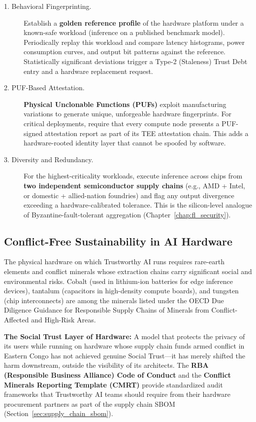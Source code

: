 \begin{description}
  \item[1. Behavioral Fingerprinting.] Establish a \textbf{golden reference profile} of the hardware platform under a known-safe workload (inference on a published benchmark model). Periodically replay this workload and compare latency histograms, power consumption curves, and output bit patterns against the reference. Statistically significant deviations trigger a Type-2 (Staleness) Trust Debt entry and a hardware replacement request.
  \item[2. PUF-Based Attestation.] \textbf{Physical Unclonable Functions (PUFs)} exploit manufacturing variations to generate unique, unforgeable hardware fingerprints. For critical deployments, require that every compute node presents a PUF-signed attestation report as part of its TEE attestation chain. This adds a hardware-rooted identity layer that cannot be spoofed by software.
  \item[3. Diversity and Redundancy.] For the highest-criticality workloads, execute inference across chips from \textbf{two independent semiconductor supply chains} (e.g., AMD + Intel, or domestic + allied-nation foundries) and flag any output divergence exceeding a hardware-calibrated tolerance. This is the silicon-level analogue of Byzantine-fault-tolerant aggregation (Chapter~\ref{chap:fl_security}).
\end{description}

\subsection{Conflict-Free Sustainability in AI Hardware}
\label{subsec:conflict_free}

The physical hardware on which Trustworthy AI runs requires rare-earth elements and conflict minerals whose extraction chains carry significant social and environmental risks. Cobalt (used in lithium-ion batteries for edge inference devices), tantalum (capacitors in high-density compute boards), and tungsten (chip interconnects) are among the minerals listed under the OECD Due Diligence Guidance for Responsible Supply Chains of Minerals from Conflict-Affected and High-Risk Areas.

\begin{svgraybox}
\textbf{The Social Trust Layer of Hardware:} A model that protects the privacy of its users while running on hardware whose supply chain funds armed conflict in Eastern Congo has not achieved genuine Social Trust---it has merely shifted the harm downstream, outside the visibility of its architects. The \textbf{RBA (Responsible Business Alliance) Code of Conduct} and the \textbf{Conflict Minerals Reporting Template (CMRT)} provide standardized audit frameworks that Trustworthy AI teams should require from their hardware procurement partners as part of the supply chain SBOM (Section~\ref{sec:supply_chain_sbom}).
\end{svgraybox}

